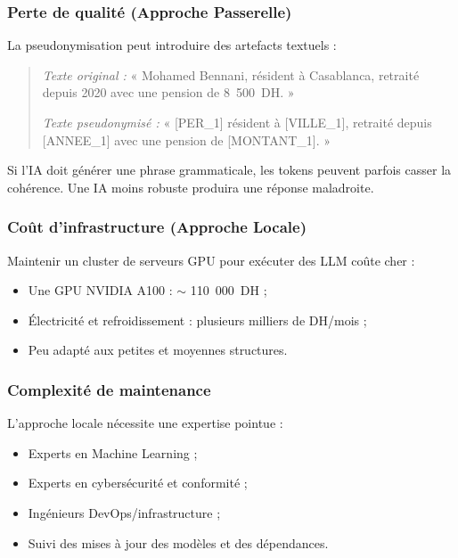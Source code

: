 \documentclass[12pt, a4paper]{report}
\begin{document}
\subsubsection{Perte de qualité (Approche Passerelle)}

La pseudonymisation peut introduire des artefacts textuels :

\begin{quote}
\textit{Texte original :} « Mohamed Bennani, résident à Casablanca,
retraité depuis 2020 avec une pension de 8~500~DH. »

\textit{Texte pseudonymisé :} « [PER\_1] résident à [VILLE\_1],
retraité depuis [ANNEE\_1] avec une pension de [MONTANT\_1]. »
\end{quote}

Si l'IA doit générer une phrase grammaticale, les tokens peuvent parfois
casser la cohérence. Une IA moins robuste produira une réponse maladroite.

\subsubsection{Coût d'infrastructure (Approche Locale)}

Maintenir un cluster de serveurs GPU pour exécuter des LLM coûte cher :

\begin{itemize}
  \item Une GPU NVIDIA A100 : \(\sim\) 110~000~DH ;
  \item Électricité et refroidissement : plusieurs milliers de DH/mois ;
  \item Peu adapté aux petites et moyennes structures.
\end{itemize}

\subsubsection{Complexité de maintenance}

L'approche locale nécessite une expertise pointue :

\begin{itemize}
  \item Experts en Machine Learning ;
  \item Experts en cybersécurité et conformité ;
  \item Ingénieurs DevOps/infrastructure ;
  \item Suivi des mises à jour des modèles et des dépendances.
\end{itemize}
\end{document}
